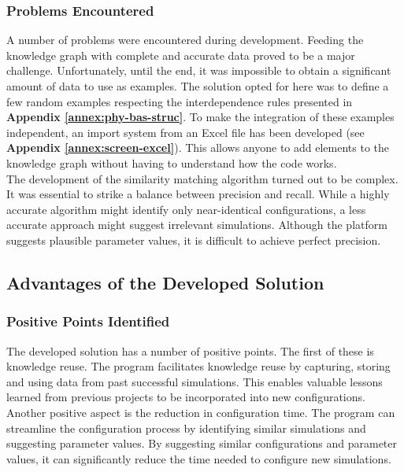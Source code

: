     
    \subsubsection{Problems Encountered}
    A number of problems were encountered during development. Feeding the knowledge graph with complete and accurate data proved to be a major challenge. Unfortunately, until the end, it was impossible to obtain a significant amount of data to use as examples. The solution opted for here was to define a few random examples respecting the interdependence rules presented in \textbf{Appendix \ref{annex:phy-bas-struc}}. To make the integration of these examples independent, an import system from an Excel file has been developed (see \textbf{Appendix \ref{annex:screen-excel}}). This allows anyone to add elements to the knowledge graph without having to understand how the code works.\\

    The development of the similarity matching algorithm turned out to be complex. It was essential to strike a balance between precision and recall. While a highly accurate algorithm might identify only near-identical configurations, a less accurate approach might suggest irrelevant simulations. Although the platform suggests plausible parameter values, it is difficult to achieve perfect precision.\\


\subsection{Advantages of the Developed Solution}
    \subsubsection{Positive Points Identified}
    The developed solution has a number of positive points. The first of these is knowledge reuse. The program facilitates knowledge reuse by capturing, storing and using data from past successful simulations. This enables valuable lessons learned from previous projects to be incorporated into new configurations.\\

    Another positive aspect is the reduction in configuration time. The program can streamline the configuration process by identifying similar simulations and suggesting parameter values. By suggesting similar configurations and parameter values, it can significantly reduce the time needed to configure new simulations.\\
    
